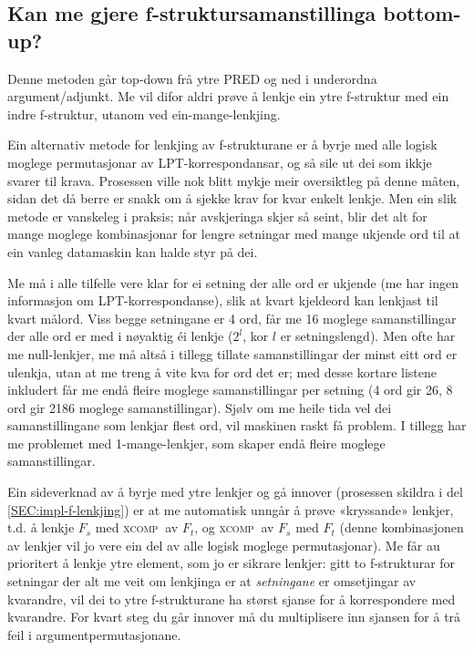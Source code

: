 \documentclass[11pt,a4paper,oneside,draft]{report}
\newcommand{\F}[2]{\textsc{#1}\ensuremath{_{#2}}}
\newcommand{\XCOMPs}{\F{xcomp~}{}}
\begin{document}
\subsection{Kan me gjere f-struktursamanstillinga bottom-up?}
\label{sec-4.1.3}


Denne metoden går top-down frå ytre PRED og ned i underordna
argument/adjunkt. Me vil difor aldri prøve å lenkje ein ytre
f-struktur med ein indre f-struktur, utanom ved ein-mange-lenkjing.

Ein alternativ metode for lenkjing av f-strukturane er å byrje med
alle logisk moglege permutasjonar av LPT-korrespondansar, og så sile
ut dei som ikkje svarer til krava. Prosessen ville nok blitt mykje
meir oversiktleg på denne måten, sidan det då berre er snakk om å
sjekke krav for kvar enkelt lenkje.  Men ein slik metode er vanskeleg
i praksis; når avskjeringa skjer så seint, blir det alt for mange
moglege kombinasjonar for lengre setningar med mange ukjende ord til
at ein vanleg datamaskin kan halde styr på dei.

Me må i alle tilfelle vere klar for ei setning der alle ord er ukjende
(me har ingen informasjon om LPT-korrespondanse), slik at kvart
kjeldeord kan lenkjast til kvart målord. Viss begge setningane er 4 ord,
får me 16 moglege samanstillingar der alle ord er med i nøyaktig éi
lenkje ($2^l$, kor $l$ er setningslengd). Men ofte har me
null-lenkjer, me må altså i tillegg tillate samanstillingar der minst
eitt ord er ulenkja, utan at me treng å vite kva for ord det er; med
desse kortare listene inkludert får me endå fleire moglege
samanstillingar per setning (4 ord gir 26, 8 ord gir 2186 moglege
samanstillingar). Sjølv om me heile tida vel dei samanstillingane som
lenkjar flest ord, vil maskinen raskt få problem. I tillegg har me
problemet med 1-mange-lenkjer, som skaper endå fleire moglege
samanstillingar.

Ein sideverknad av å byrje med ytre lenkjer og gå innover (prosessen
skildra i del \ref{SEC:impl-f-lenkjing}) er at me automatisk unngår å
prøve «kryssande» lenkjer, t.d. å lenkje $F_s$ med \XCOMPs av $F_t$, og
\XCOMPs av $F_s$ med $F_t$ (denne kombinasjonen av lenkjer vil jo vere
ein del av alle logisk moglege permutasjonar). Me får au prioritert å
lenkje ytre element, som jo er sikrare lenkjer: gitt to f-strukturar
for setningar der alt me veit om lenkjinga er at \emph{setningane} er
omsetjingar av kvarandre, vil dei to ytre f-strukturane ha størst
sjanse for å korrespondere med kvarandre. For kvart steg du går
innover må du multiplisere inn sjansen for å trå feil i
argumentpermutasjonane.
\end{document}
